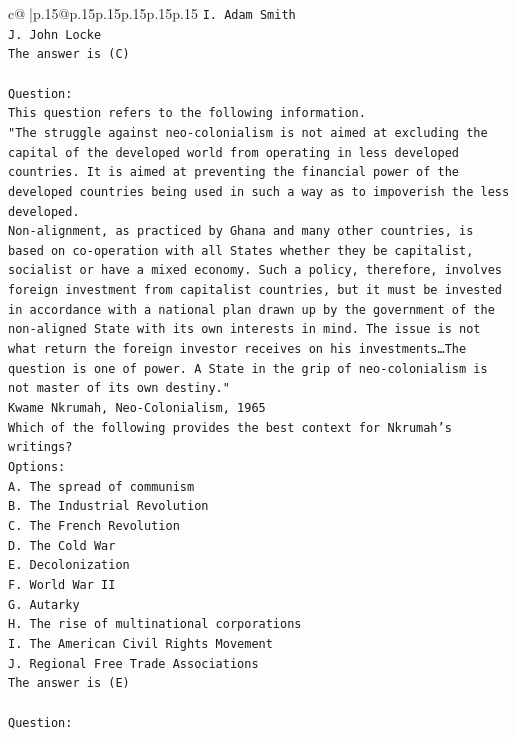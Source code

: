 \documentclass{article}
\begin{document}
{\begin{supertabular}{c@{$\;$}|p{.15\linewidth}@{}p{.15\linewidth}p{.15\linewidth}p{.15\linewidth}p{.15\linewidth}p{.15\linewidth}}
{{{\texttt{I. Adam Smith} \\
\texttt{J. John Locke} \\
\texttt{The answer is (C)} \\
\\ 
\texttt{Question:} \\
\texttt{This question refers to the following information.} \\
\texttt{"The struggle against neo{-}colonialism is not aimed at excluding the capital of the developed world from operating in less developed countries. It is aimed at preventing the financial power of the developed countries being used in such a way as to impoverish the less developed.} \\
\texttt{Non{-}alignment, as practiced by Ghana and many other countries, is based on co{-}operation with all States whether they be capitalist, socialist or have a mixed economy. Such a policy, therefore, involves foreign investment from capitalist countries, but it must be invested in accordance with a national plan drawn up by the government of the non{-}aligned State with its own interests in mind. The issue is not what return the foreign investor receives on his investments…The question is one of power. A State in the grip of neo{-}colonialism is not master of its own destiny."} \\
\texttt{Kwame Nkrumah, Neo{-}Colonialism, 1965} \\
\texttt{Which of the following provides the best context for Nkrumah's writings?} \\
\texttt{Options:} \\
\texttt{A. The spread of communism} \\
\texttt{B. The Industrial Revolution} \\
\texttt{C. The French Revolution} \\
\texttt{D. The Cold War} \\
\texttt{E. Decolonization} \\
\texttt{F. World War II} \\
\texttt{G. Autarky} \\
\texttt{H. The rise of multinational corporations} \\
\texttt{I. The American Civil Rights Movement} \\
\texttt{J. Regional Free Trade Associations} \\
\texttt{The answer is (E)} \\
\\ 
\texttt{Question:} \\
}}}
\end{supertabular}}
\end{document}
